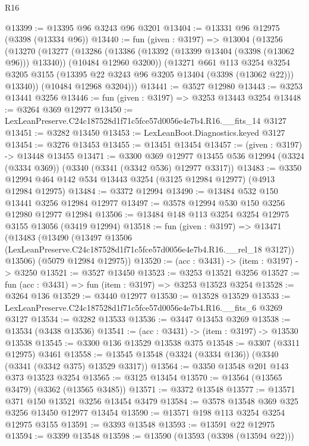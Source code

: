 \begin{lexlean}{R16}
\begin{coremodule}
@13399 := @13395 @96 @3243 @96 @3201
@13404 := @13331 @96 @12975 (@3398 (@13334 @96))
@13440 := fun (given : @3197) =>
  @13004
    (@13256
      (@13270
        (@13277
          (@13286
            (@13386 (@13392 (@13399 @13404 (@3398 (@13062 @96))) @13340))
            (@10484 @12960 @3200))
          (@13271
            @661
            @113
            @3254
            @3254
            @3205
            @3155
            (@13395 @22 @3243 @96 @3205 @13404 (@3398 (@13062 @22)))
            @13340))
        (@10484 @12968 @3204)))
@13441 := @3527 @12980
@13443 := @3253 @13441 @3256
@13446 := fun (given : @3197) => @3253 @13443 @3254
@13448 := @3264 @369 @12977
@13450 := LexLeanPreserve.C24c187528d1f71c5fce57d0056e4e7b4.R16.__fits_14 @3127
@13451 := @3282 @13450
@13453 := LexLeanBoot.Diagnostics.keyed @3127
@13454 := @3276 @13453
@13455 := @13451 @13454
@13457 := (given : @3197) -> @13448 @13455
@13471 := @3300
    @369
    @12977
    @13455
    @536
    @12994
    (@3324 (@3334 @369))
    (@3340 (@3341 (@3342 @536) @12977 @3317))
@13483 := @3350 @12994 @464 @142 @534 @13443 @3254 (@3125 @12984 @12977) (@4913 @12984 @12975)
@13484 := @3372 @12994
@13490 := @13484 @532 @150 @13441 @3256 @12984 @12977
@13497 := @3578 @12994 @530 @150 @3256 @12980 @12977 @12984
@13506 := @13484 @148 @113 @3254 @3254 @12975 @3155 @13056 (@3419 @12994)
@13518 := fun (given : @3197) =>
  @13471
    (@13483
      (@13490
        (@13497 @13506 (LexLeanPreserve.C24c187528d1f71c5fce57d0056e4e7b4.R16.__rel_18 @3127))
        @13506)
      (@5079 @12984 @12975))
@13520 := (acc : @3431) -> (item : @3197) -> @3250
@13521 := @3527 @13450
@13523 := @3253 @13521 @3256
@13527 := fun (acc : @3431) => fun (item : @3197) => @3253 @13523 @3254
@13528 := @3264 @136
@13529 := @3440 @12977
@13530 := @13528 @13529
@13533 := LexLeanPreserve.C24c187528d1f71c5fce57d0056e4e7b4.R16.__fits_6 @3269 @3127
@13534 := @3282 @13533
@13536 := @3447 @13453 @3269
@13538 := @13534 (@3438 @13536)
@13541 := (acc : @3431) -> (item : @3197) -> @13530 @13538
@13545 := @3300 @136 @13529 @13538 @375
@13548 := @3307 (@3311 @12975) @3461
@13558 := @13545 @13548 (@3324 (@3334 @136)) (@3340 (@3341 (@3342 @375) @13529 @3317))
@13564 := @3350 @13548 @201 @143 @373 @13523 @3254
@13565 := @3125 @13454
@13570 := @13564 (@13565 @3479) (@3362 (@13565 @3485))
@13571 := @3372 @13548
@13577 := @13571 @371 @150 @13521 @3256 @13454 @3479
@13584 := @3578 @13548 @369 @325 @3256 @13450 @12977 @13454
@13590 := @13571 @198 @113 @3254 @3254 @12975 @3155
@13591 := @3393 @13548
@13593 := @13591 @22 @12975
@13594 := @3399 @13548
@13598 := @13590 (@13593 (@3398 (@13594 @22)))

\end{coremodule}
\end{lexlean}
